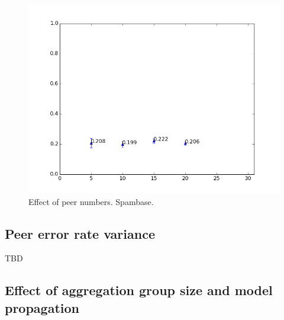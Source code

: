 \begin{figure}[H]
	\centering
	\includegraphics[width=\textwidth]{fig/spambase/eps1.0,bud1.0,peers5-30,groups5,reg2e-2-puball-peercounts-data150-spam-testmean}
	\caption{Effect of peer numbers. Spambase.}
	\label{fig:peer_range_constant_group_spam}
\end{figure}


\subsection{Peer error rate variance}

TBD

\subsection{Effect of aggregation group size and model propagation}


